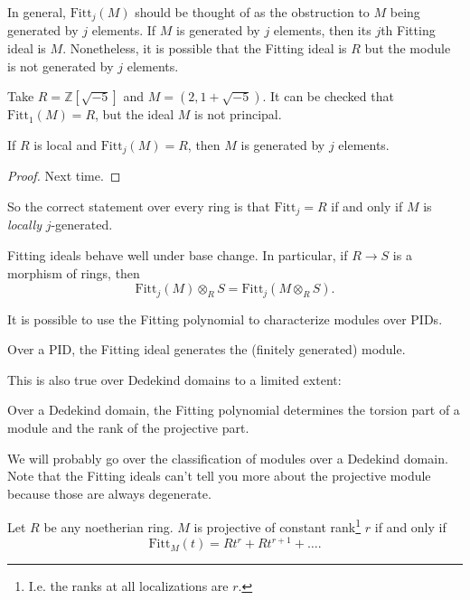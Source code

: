 In general, $\mathrm{Fitt}_j(M)$ should be thought of as the obstruction to $M$
being generated by $j$ elements. If $M$ is generated by $j$ elements, then its
$j$th Fitting ideal is $M$. Nonetheless, it is possible that the Fitting ideal
is $R$ but the module is not generated by $j$ elements.

\begin{example} 
Take $R  = \mathbb{Z}[\sqrt{-5}]$ and $M = (2, 1+\sqrt{-5})$. It can be checked
that $\mathrm{Fitt}_1(M) = R$, but the ideal $M$ is not principal. 
\end{example} 

\begin{proposition} 
If $R$ is local and $\mathrm{Fitt}_j(M) =R$, then $M$ is generated by $j$
elements. 
\end{proposition} 
\begin{proof} 
Next time.
\end{proof} 

So the correct statement over every ring is that $\mathrm{Fitt}_j=R$ if and
only if $M$ is \emph{locally} $j$-generated.

\begin{remark} 
Fitting ideals behave well under base change.  In particular, if $R \to S$ is a
morphism of rings, then
\[ \mathrm{Fitt}_j(M) \otimes_R S = \mathrm{Fitt}_j(M \otimes_R S).   \]
\end{remark} 

It is possible to use the Fitting polynomial to characterize modules over PIDs.

\begin{theorem} 
Over a PID, the Fitting ideal generates the (finitely generated) module.
\end{theorem} 

This is also true over Dedekind domains to a limited extent:

\begin{theorem} 
Over a Dedekind domain, the Fitting polynomial determines the torsion part of a
module and the rank of the projective part.
\end{theorem} 

We will probably go over the classification of modules over a Dedekind domain.
Note that the Fitting ideals can't tell you more about the projective module
because those are always degenerate.

\begin{theorem} Let $R$ be any noetherian ring. 
$M$ is projective of constant rank\footnote{I.e. the ranks at all localizations
are $r$.} $r$ if and only if 
\[ \mathrm{Fitt}_M(t) = Rt^r + Rt^{r+1} + \dots.   \]
\end{theorem} 


